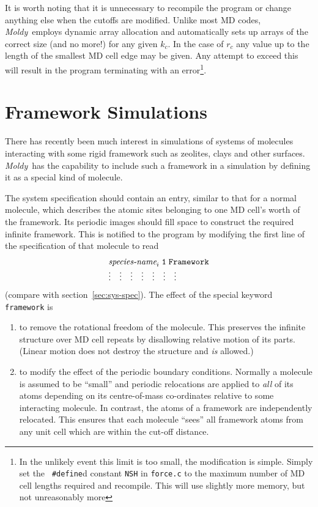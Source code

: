 \documentclass[twoside]{report}
\newcommand{\moldy}{{\em Moldy}}
\begin{document}
It is worth noting that it is unnecessary to recompile the program or
change anything else when the cutoffs are modified. Unlike most MD
codes, \moldy\  employs dynamic array allocation and automatically sets
up arrays of the correct size (and no more!) for any given $k_{c}$.
In the case of $r_{c}$ any value up to the length of the smallest MD
cell edge may be given. Any attempt to exceed this will result in the
program terminating with an error\footnote{In the unlikely event this
limit is too small, the modification is simple.  Simply set the {\tt
\#define}d constant {\tt NSH} in {\tt force.c} to the maximum number of
MD cell lengths required and recompile.  This will use slightly more
memory, but not unreasonably more}.

\section{Framework Simulations}%

There has recently been much interest in simulations of systems of
molecules interacting with some rigid framework such as zeolites,
clays and other surfaces.  \moldy\  has the capability to include such a
framework in a simulation by defining it as a special kind of molecule.

The system specification should contain an entry, similar to that for
a normal molecule, which describes the atomic sites belonging to one
MD cell's worth of the framework.  Its periodic images should fill
space to construct the required infinite framework.  This is notified
to the program by modifying the first line of the specification of
that molecule to read
\begin{displaymath}
\begin{array}{lllllll}
\multicolumn{7}{l}{\mbox{{\it species-name}}_{i} {\tt \; 1 \; Framework}}  \\
\vdots & \vdots & \vdots & \vdots & \vdots & \vdots & \vdots \\
\end{array}
\end{displaymath}
(compare with section~\ref{sec:sys-spec}).  The effect of the special
keyword \texttt{framework} is
\begin{enumerate}
\item to remove the rotational freedom of the molecule.  This
preserves the infinite structure over MD cell repeats by disallowing
relative motion of its parts. (Linear motion does not destroy the
structure and {\em is\/} allowed.)
\item to modify the effect of the periodic boundary conditions.
Normally a molecule is assumed to be ``small'' and periodic relocations
are applied to {\em all\/} of its atoms depending on its centre-of-mass
co-ordinates relative to some interacting molecule.  In contrast, the
atoms of a framework are independently relocated.  This ensures that
each molecule ``sees'' all framework atoms from any unit cell which
are within the cut-off distance.
\end{enumerate}
\end{document}

